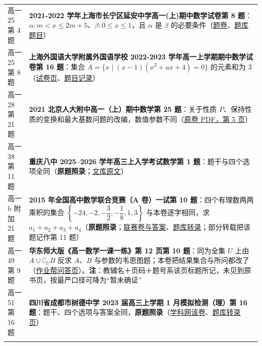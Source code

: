 \documentclass[a4paper,11pt]{article}
\begin{document}
\begin{xltabular}{\textwidth}{@{}>{\raggedright\arraybackslash}p{6.55cm}>{\raggedright\arraybackslash}p{8.60cm}@{}}
高一25 第 4 题 & \textbf{2021-2022 学年上海市长宁区延安中学高一(上)期中数学试卷第 8 题}：\(\alpha:m<x\leqslant\allowbreak 2m+\allowbreak 5\)、\(\beta:0\leqslant\allowbreak  x\leqslant\allowbreak 1\)，且 \(\alpha\) 是 \(\beta\) 的必要条件（\href{https://wenku.baidu.com/view/a03d55a19a8fcc22bcd126fff705cc1755275f3a.html}{题卷}、\href{https://easylearn.baidu.com/edu-page/tiangong/questiondetail?id=1821449707484889844}{题库题目}） \\ \addlinespace[1pt]
高一25 第 8 题 & \textbf{上海外国语大学附属外国语学校 2022-2023 学年高一上学期期中数学试卷第 16 题}：集合 \(A=\allowbreak \{x\mid\allowbreak (x-1)(x^2+ax+\allowbreak 4)=\allowbreak 0\}\) 的元素和为 \(3\)（\href{https://wenku.baidu.com/view/e327fb6dac45b307e87101f69e3143323968f5cd.html}{试卷页}、\href{https://easylearn.baidu.com/edu-page/tiangong/questiondetail?id=1838633019273585885}{题目记录}） \\ \addlinespace[1pt]
高一28 第 21 题 & \textbf{2021 北京人大附中高一（上）期中数学第 25 题}：关于性质 \(P\)、保持性质的变换和最大基数问题的改编，数值参数不同（\href{https://cdn.gaokzx.com/zixunzhan/202403/b7220d0a-4b00-44d4-9af4-0bf53b75509e.pdf}{原卷 PDF，第 5 页}） \\ \addlinespace[1pt]
高一38 第 11 题 & \textbf{重庆八中 2025--2026 学年高三上入学考试数学第 1 题}：题干与四个选项全同（\textbf{原题照录}；\href{https://wenku.baidu.com/view/1355b33235126edb6f1aff00bed5b9f3f90f720c.html}{文库原文}） \\ \addlinespace[1pt]
高一b 附加 21 题 & \textbf{2015 年全国高中数学联合竞赛（A 卷）一试第 10 题}：四个有理数两两乘积的集合 \(\left\{-24,\allowbreak -2,\allowbreak -\dfrac{3}{2},\allowbreak -\dfrac{1}{8},\allowbreak 1,\allowbreak 3\right\}\) 与本卷逐字相同，求 \(a_1+a_2+a_3+a_4\)（\textbf{原题照录}；\href{https://www.zizzs.com/c/201509/10211.html}{联赛卷与答案}、\href{https://easylearn.baidu.com/edu-page/tiangong/questiondetail?id=1728075524877136102}{题库转录}；部分转载把该题记作第 11 题） \\ \addlinespace[1pt]
高一49 第 9 题 & \textbf{华东师大版《高一数学一课一练》第 12 页第 10 题}：同为全集 \(U\) 上由 \(A\cup\allowbreak \complement_UB\) 反求 \(A\)、\(B\) 与参数的韦恩图题；本卷把结果集合与所问都改了（\href{https://qb.zuoyebang.com/xfe-question/question/8b99b3f747f333af831d80a5953f964b.html}{作业帮问答页}）。\textbf{注}：教辅名＋页码＋题号系该页标题所记，未见到原书页，按最严口径可降为``暂未确证'' \\ \addlinespace[1pt]
高一51 第 16 题 & \textbf{四川省成都市树德中学 2023 届高三上学期 1 月模拟检测（理）第 16 题}：题干、四个选项与答案全同，\textbf{原题照录}（\href{https://www.zxxk.com/soft/37398890.html}{学科网该卷}、\href{https://easylearn.baidu.com/edu-page/tiangong/questiondetail?id=1816381419158437023}{题库转录页}） \\ \addlinespace[1pt]

\end{xltabular}
\end{document}
